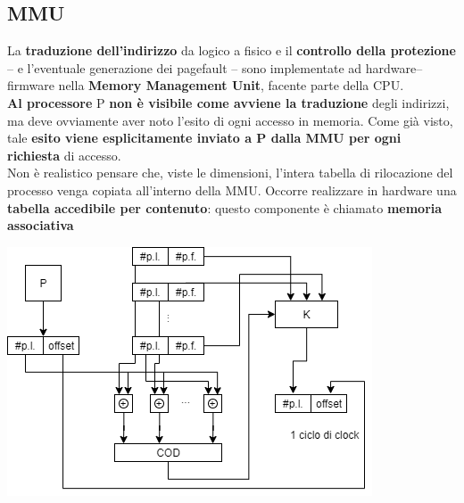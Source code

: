 \documentclass[10pt]{report}
\begin{document}
\subsection{MMU}
La \textbf{traduzione dell'indirizzo} da logico a fisico e il \textbf{controllo della protezione} -- e l'eventuale generazione dei pagefault -- sono implementate ad hardware--firmware nella \textbf{Memory Management Unit}, facente parte della CPU.\\
\textbf{Al processore} P \textbf{non è visibile come avviene la traduzione} degli indirizzi, ma deve ovviamente aver noto l'esito di ogni accesso in memoria. Come già visto, tale \textbf{esito viene esplicitamente inviato a P dalla MMU per ogni richiesta} di accesso.\\
Non è realistico pensare che, viste le dimensioni, l'intera tabella di rilocazione del processo venga copiata all'interno della MMU. Occorre realizzare in hardware una \textbf{tabella accedibile per contenuto}: questo componente è chiamato \textbf{memoria associativa}
\begin{center}
\includegraphics[scale=1]{mmu.png}
\end{center}
\end{document}
